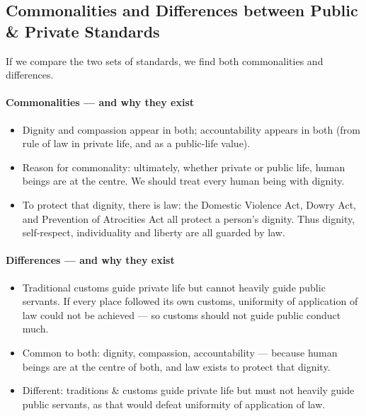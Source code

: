 \subsection{Commonalities and Differences between Public \& Private Standards}

If we compare the two sets of standards, we find both commonalities and differences.

\paragraph{Commonalities --- and why they exist}
\begin{itemize}
\item Dignity and compassion appear in both; accountability appears in both (from rule of law in private life, and as a public-life value).
\item Reason for commonality: ultimately, whether private or public life, human beings are at the centre. We should treat every human being with dignity.
\item To protect that dignity, there is law: the Domestic Violence Act, Dowry Act, and Prevention of Atrocities Act all protect a person's dignity. Thus dignity, self-respect, individuality and liberty are all guarded by law.
\end{itemize}

\paragraph{Differences --- and why they exist}
\begin{itemize}
\item Traditional customs guide private life but cannot heavily guide public servants. If every place followed its own customs, uniformity of application of law could not be achieved --- so customs should not guide public conduct much.
\end{itemize}

\begin{ComparisonBox}
\begin{itemize}
\item Common to both: dignity, compassion, accountability --- because human beings are at the centre of both, and law exists to protect that dignity.
\item Different: traditions \& customs guide private life but must not heavily guide public servants, as that would defeat uniformity of application of law.
\end{itemize}
\end{ComparisonBox}

